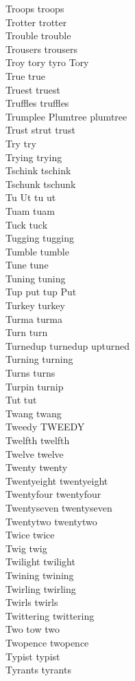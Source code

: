 Troops troops\\
Trotter trotter\\
Trouble trouble\\
Trousers trousers\\
Troy tory tyro Tory\\
True true\\
Truest truest\\
Truffles truffles\\
Trumplee Plumtree plumtree\\
Trust strut trust\\
Try try\\
Trying trying\\
Tschink tschink\\
Tschunk tschunk\\
Tu Ut tu ut\\
Tuam tuam\\
Tuck tuck\\
Tugging tugging\\
Tumble tumble\\
Tune tune\\
Tuning tuning\\
Tup put tup Put\\
Turkey turkey\\
Turma turma\\
Turn turn\\
Turnedup turnedup upturned\\
Turning turning\\
Turns turns\\
Turpin turnip\\
Tut tut\\
Twang twang\\
Tweedy TWEEDY\\
Twelfth twelfth\\
Twelve twelve\\
Twenty twenty\\
Twentyeight twentyeight\\
Twentyfour twentyfour\\
Twentyseven twentyseven\\
Twentytwo twentytwo\\
Twice twice\\
Twig twig\\
Twilight twilight\\
Twining twining\\
Twirling twirling\\
Twirls twirls\\
Twittering twittering\\
Two tow two\\
Twopence twopence\\
Typist typist\\
Tyrants tyrants\\

